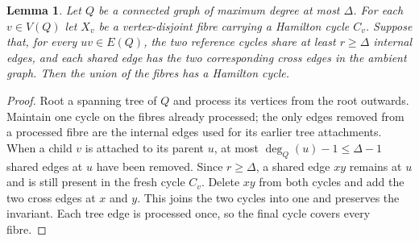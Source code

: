\documentclass[11pt]{article}
\newtheorem{lemma}[theorem]{Lemma}
\theoremstyle{remark}
\numberwithin{equation}{section}
\numberwithin{table}{section}
\begin{document}
\begin{lemma}\label{lem:protected-tree-splicing}
Let $Q$ be a connected graph of maximum degree at most $\Delta$.  For
each $v\in V(Q)$ let $X_v$ be a vertex-disjoint fibre carrying a
Hamilton cycle $C_v$.  Suppose that, for every $uv\in E(Q)$, the two
reference cycles share at least $r\ge\Delta$ internal edges, and
each shared edge has the two corresponding cross edges in the ambient
graph.  Then the union of the fibres has a Hamilton cycle.
\end{lemma}
\begin{proof}
Root a spanning tree of $Q$ and process its vertices from the root
outwards.  Maintain one cycle on the fibres already processed; the
only edges removed from a processed fibre are the internal edges used
for its earlier tree attachments.  When a child $v$ is attached to
its parent $u$, at most $\deg_Q(u)-1\le\Delta-1$ shared edges at $u$
have been removed.  Since $r\ge\Delta$, a shared edge $xy$ remains
at $u$ and is still present in the fresh cycle $C_v$.  Delete $xy$
from both cycles and add the two cross edges at $x$ and $y$.  This
joins the two cycles into one and preserves the invariant.  Each
tree edge is processed once, so the final cycle covers every fibre.
\end{proof}
\end{document}
